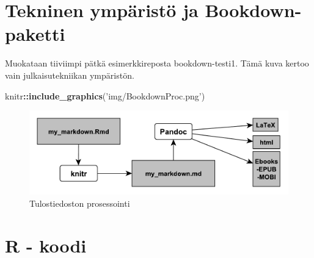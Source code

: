 \documentclass[
  finnish,
]{book}
\newenvironment{Shaded}{\begin{snugshade}}{\end{snugshade}}
\newcommand{\CommentTok}[1]{\textcolor[rgb]{0.56,0.35,0.01}{\textit{#1}}}
\newcommand{\KeywordTok}[1]{\textcolor[rgb]{0.13,0.29,0.53}{\textbf{#1}}}
\newcommand{\NormalTok}[1]{#1}
\newcommand{\OperatorTok}[1]{\textcolor[rgb]{0.81,0.36,0.00}{\textbf{#1}}}
\newcommand{\StringTok}[1]{\textcolor[rgb]{0.31,0.60,0.02}{#1}}
\begin{document}
\hypertarget{tekninen-ympuxe4ristuxf6-ja-bookdown-paketti}{%
\section{Tekninen ympäristö ja
Bookdown-paketti}\label{tekninen-ympuxe4ristuxf6-ja-bookdown-paketti}}

Muokataan tiiviimpi pätkä esimerkkireposta bookdown-testi1. Tämä kuva
kertoo vain julkaisutekniikan ympäristön.

\begin{Shaded}
\begin{Highlighting}[]
\NormalTok{knitr}\OperatorTok{::}\KeywordTok{include_graphics}\NormalTok{(}\StringTok{'img/BookdownProc.png'}\NormalTok{)}
\end{Highlighting}
\end{Shaded}

\begin{figure}

{\centering \includegraphics[width=0.7\linewidth]{img/BookdownProc} 

}

\caption{Tulostiedoston prosessointi}\label{fig:L3bdprocess1}
\end{figure}

\begin{Shaded}
\end{Shaded}

\hypertarget{r---koodi}{%
\section{R - koodi}\label{r---koodi}}
\end{document}
